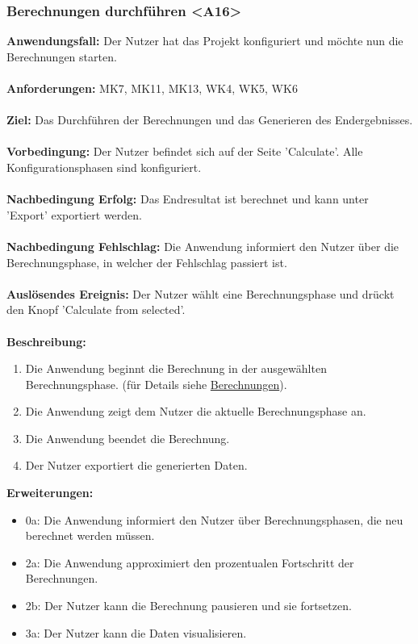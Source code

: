 \documentclass[parskip=full]{scrartcl} %
\begin{document}
\subsubsection*{Berechnungen durchführen <A16>}
\textbf{Anwendungsfall:} Der Nutzer hat das Projekt konfiguriert und möchte nun die Berechnungen starten.\\\\
\textbf{Anforderungen:} MK7, MK11, MK13, WK4, WK5, WK6\\\\
\textbf{Ziel:} Das Durchführen der Berechnungen und das Generieren des Endergebnisses.\\\\
\textbf{Vorbedingung:} Der Nutzer befindet sich auf der Seite 'Calculate'. Alle Konfigurationsphasen sind konfiguriert.\\\\
\textbf{Nachbedingung Erfolg:} Das Endresultat ist berechnet und kann unter 'Export' exportiert werden. \\\\
\textbf{Nachbedingung Fehlschlag:} Die Anwendung informiert den Nutzer über die Berechnungsphase, in welcher der Fehlschlag passiert ist. \\\\
\textbf{Auslösendes Ereignis:} Der Nutzer wählt eine Berechnungsphase und drückt den Knopf 'Calculate from selected'.\\\\
\textbf{Beschreibung:}
\begin{enumerate}
    \item Die Anwendung beginnt die Berechnung in der ausgewählten Berechnungsphase. (für Details siehe \hyperlink{calculations}{Berechnungen}).
    \item Die Anwendung zeigt dem Nutzer die aktuelle Berechnungsphase an.
    \item Die Anwendung beendet die Berechnung.
    \item Der Nutzer exportiert die generierten Daten.
\end{enumerate}
\textbf{Erweiterungen:} 
\begin{itemize}
    \item 0a: Die Anwendung informiert den Nutzer über Berechnungsphasen, die neu berechnet werden müssen.
    \item 2a: Die Anwendung approximiert den prozentualen Fortschritt der Berechnungen.
    \item 2b: Der Nutzer kann die Berechnung pausieren und sie fortsetzen.
    \item 3a: Der Nutzer kann die Daten visualisieren.
\end{itemize}
\newpage
\end{document}

